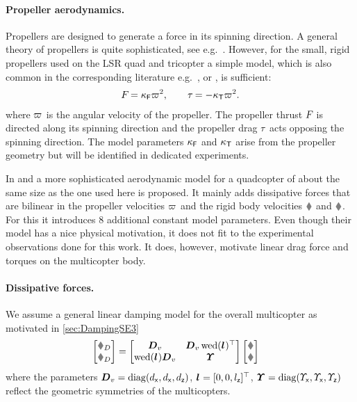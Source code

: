 \paragraph{Propeller aerodynamics.}
Propellers are designed to generate a force in its spinning direction.
A general theory of propellers is quite sophisticated, see e.g.\ \cite{Johnson:HelicopterTheory}.
However, for the small, rigid propellers used on the LSR quad and tricopter a simple model, which is also common in the corresponding literature e.g.\ \cite{Mahony:Quadrotor2002}, \cite{MellingerIJRR12} or \cite{Fritsch:Diss}, is sufficient:
\begin{align}\label{eq:RealizationModelPropeller}
 F_{} = \kappa_{\mathsf{F}} \varpi_{}^2,
\qquad
 \tau_{} = -\kappa_{\mathsf{T}} \varpi_{}^2.
\end{align}
where $\varpi_{}$ is the angular velocity of the propeller.
The propeller thrust $F_{}$ is directed along its spinning direction and the propeller drag $\tau_{}$ acts opposing the spinning direction.
The model parameters $\kappa_{\mathsf{F}}$ and $\kappa_{\mathsf{T}}$ arise from the propeller geometry but will be identified in dedicated experiments.

In \cite{Bristeau:Propeller} and \cite{Martin:AccelerometerFeedback} a more sophisticated aerodynamic model for a quadcopter of about the same size as the one used here is proposed.
It mainly adds dissipative forces that are bilinear in the propeller velocities $\varpi_{}$ and the rigid body velocities $\v$ and $\w$.
For this it introduces 8 additional constant model parameters.
Even though their model has a nice physical motivation, it does not fit to the experimental observations done for this work.
It does, however, motivate linear drag force and torques on the multicopter body.

\paragraph{Dissipative forces.}
We assume a general linear damping model for the overall multicopter as motivated in \autoref{sec:DampingSE3}
\begin{align}
 \begin{bmatrix} \tuple{\bodyForceSym}_D \\ \tuple{\bodyTorqueSym}_D \end{bmatrix}
 &= 
 \begin{bmatrix} \mat{D}_v & \mat{D}_v \wedOp(\bodyCOD{}{})^\top \\ \wedOp(\bodyCOD{}{}) \mat{D}_v & \bodyMOD{}{} \end{bmatrix}
 \begin{bmatrix} \v \\ \w \end{bmatrix}
\end{align}
where the parameters $\boldsymbol{D}_v = \operatorname{diag}(d_{\mathsf{x}}, d_{\mathsf{x}}, d_{\mathsf{z}})$, $\bodyCOD{}{}{} = [0,0,\lz]^\top$, $\bodyMOD{}{}{} = \diag(\sigx, \sigx, \sigz)$ reflect the geometric symmetries of the multicopters.


